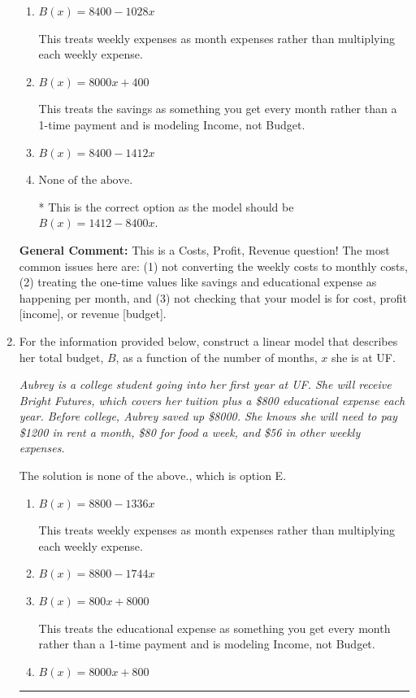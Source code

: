 \documentclass{extbook}[14pt]
\newcommand{\litem}[1]{\item #1

\rule{\textwidth}{0.4pt}}
\begin{document}
\begin{enumerate}
{\begin{enumerate}[label=\Alph*.]
This treats the educational expense as something you get every month rather than a 1-time payment and is modeling Income, not Budget.
\item \( B(x) = 8400 - 1028 x \)

This treats weekly expenses as month expenses rather than multiplying each weekly expense.
\item \( B(x) = 8000 x + 400 \)

This treats the savings as something you get every month rather than a 1-time payment and is modeling Income, not Budget.
\item \( B(x) = 8400 - 1412 x \)


\item \( \text{None of the above.} \)

* This is the correct option as the model should be $B(x) = 1412 - 8400 x$.
\end{enumerate}

\textbf{General Comment:} This is a Costs, Profit, Revenue question! The most common issues here are: (1) not converting the weekly costs to monthly costs, (2) treating the one-time values like savings and educational expense as happening per month, and (3) not checking that your model is for cost, profit [income], or revenue [budget].
}
\litem{
For the information provided below, construct a linear model that describes her total budget, $B$, as a function of the number of months, $x$ she is at UF.

\begin{center}
    \textit{ Aubrey is a college student going into her first year at UF. She will receive Bright Futures, which covers her tuition plus a \$800 educational expense each year. Before college, Aubrey saved up \$8000. She knows she will need to pay \$1200 in rent a month, \$80 for food a week, and \$56 in other weekly expenses. }
\end{center}
The solution is \( \text{none of the above.} \), which is option E.\begin{enumerate}[label=\Alph*.]
\item \( B(x) = 8800 - 1336 x \)

This treats weekly expenses as month expenses rather than multiplying each weekly expense.
\item \( B(x) = 8800 - 1744 x \)


\item \( B(x) = 800 x + 8000 \)

This treats the educational expense as something you get every month rather than a 1-time payment and is modeling Income, not Budget.
\item \( B(x) = 8000 x + 800 \)


\end{enumerate}}
\end{enumerate}
\end{document}
